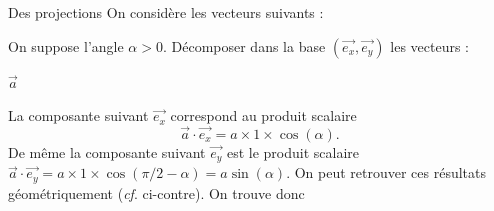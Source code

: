 \begin{exo}[PC][1][appli]{Des projections}
  \renewcommand{\pathtofiche}{\pathtoexos/_fiches/fiche_MCA02/_images/}
  \hauteurLargeurCadreReponse		{9mm}{10cm}
  On considère les vecteurs suivants :
  \begin{center}
  \end{center}

  \vspace{-0.25cm}

  On suppose l'angle $\alpha > 0$. Décomposer dans la base $(\Vec{e_x}, \Vec{e_y})$ les vecteurs :

  \debutEntrainement



  \begin{enonce}
  	$\Vec{a}$
  \end{enonce}


  \begin{corrige}


   \initialisationPartieGauche %

  La composante suivant $\Vec{e_x}$ correspond au produit scalaire
  \[
  \Vec{a}\cdot \Vec{e_x}=a\times 1\times \cos(\alpha).
  \]
  De même la composante suivant $\Vec{e_y}$ est le produit scalaire  $\Vec{a}\cdot \Vec{e_y}=a\times 1\times \cos(\pi/2-\alpha)=a\sin(\alpha)$. On peut retrouver ces résultats géométriquement (\emph{cf}. ci-contre). On trouve donc 

   \initialisationPartieDroite %


\end{corrige}
\end{exo}
